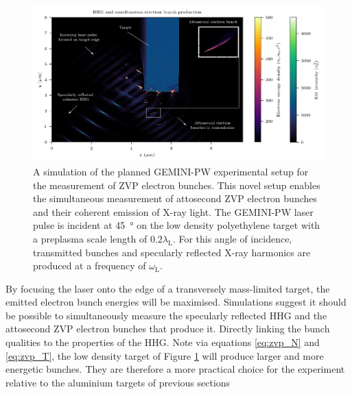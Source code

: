 \begin{figure}
	\centering
	\includegraphics[width=1\linewidth]{figures/zvp/Experiment_setup_HHG_bunches2}
	\caption[Planned GEMINI-PW experimental setup for the measurement of ZVP electron bunches.]{A simulation of the planned GEMINI-PW experimental setup for the measurement of ZVP electron bunches. This novel setup enables the simultaneous measurement of attosecond ZVP electron bunches and their coherent emission of X-ray light. The GEMINI-PW laser pulse is incident at \qty{45}{\degree} on the low density polyethylene target with a preplasma scale length of $0.2\lambda_\mathrm{L}$. For this angle of incidence, transmitted bunches and specularly reflected X-ray harmonics are produced at a frequency of $\omega_\mathrm{L}$.}
	\label{fig:experimentsetuphhgbunches2}
\end{figure}
By focusing the laser onto the edge of a transversely mass-limited target, the emitted electron bunch energies will be maximised. Simulations suggest it should be possible to simultaneously measure the specularly reflected \ac{HHG} and the attosecond ZVP electron bunches that produce it. Directly linking the bunch qualities to the properties of the \ac{HHG}. Note via equations \ref{eq:zvp_N} and \ref{eq:zvp_T}, the low density target of Figure \ref{fig:experimentsetuphhgbunches2} will produce larger and more energetic bunches. They are therefore a more practical choice for the experiment relative to the aluminium targets of previous sections


